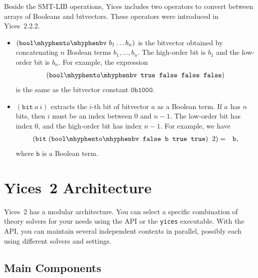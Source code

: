 \documentclass[11pt,twoside,fleqn,openright,titlepage]{cslreport}
\begin{document}
\medskip\noindent Beside the SMT-LIB operations, Yices includes two
operators to convert between arrays of Booleans and bitvectors. These
operators were introduced in Yices~2.2.2.
\begin{itemize}
\item $(\mathtt{bool\mhyphen to\mhyphen bv}\ b_1 \ldots b_n)$ is the
  bitvector obtained by concatenating $n$ Boolean terms
  $b_1,\ldots,b_n$. The high-order bit is $b_1$ and the low-order bit
  is $b_n$.  For example, the expression
$$(\mathtt{bool\mhyphen to\mhyphen bv}\ \:\mathtt{true}\ \:\mathtt{false}\ \:\mathtt{false}\ \:\mathtt{false})$$
is the same as the bitvector constant $\mathtt{0b1000}$.
\item $(\mathtt{bit}\ a\ i)$ extracts the $i$-th bit of bitvector $a$
  as a Boolean term. If $a$ has $n$ bits, then $i$ must be an index
  between $0$ and $n-1$. The low-order bit has index 0, and the high-order bit has index $n-1$.
For example, we have
\begin{eqnarray*}
(\mathtt{bit}\ (\mathtt{bool\mhyphen to\mhyphen bv}\ \:\mathtt{false}\ \:\mathtt{b}\ \:\mathtt{true}\ \:\mathtt{true})\ \:2) & = & \mathtt{b},
\end{eqnarray*}
where $\mathtt{b}$ is a Boolean term.
\begin{small}
\end{small}
\end{itemize}



\chapter{Yices~2 Architecture}
\label{architecture-chapter}

Yices~2 has a modular architecture.  You can select a specific
combination of theory solvers for your needs using the API or the
\texttt{yices} executable.  With the API, you can maintain several
independent contexts in parallel, possibly each using different
solvers and settings.

\section{Main Components}
\end{document}
